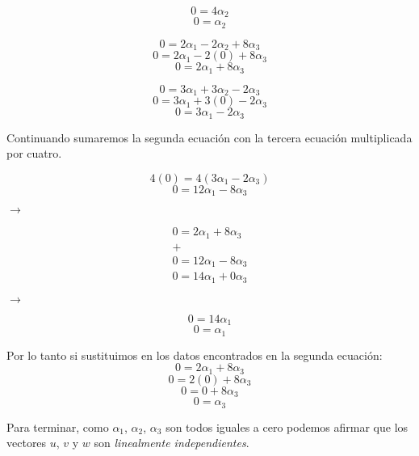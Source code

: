 \documentclass{article}
\begin{document}
\begin{minipage}[c]{0.5cm}
   $$0 = 4\alpha_2$$
   $$0 = \alpha_2$$
\end{minipage} \hspace*{3cm}
\begin{minipage}[c]{0.5cm}
   $$0 =  2\alpha_1 - 2\alpha_2+ 8\alpha_3$$
   $$0 = 2\alpha_1 -2(0) + 8\alpha_3$$
   $$0 = 2\alpha_1+ 8\alpha_3$$
\end{minipage} \hspace*{3cm}
\begin{minipage}[c]{0.5cm}
   $$0 = 3\alpha_1 + 3\alpha_2 -2\alpha_3$$
   $$0= 3\alpha_1 + 3(0) -2\alpha_3$$
   $$0= 3\alpha_1 -2\alpha_3$$
\end{minipage}
\vspace{10pt}


Continuando sumaremos la segunda ecuación con la tercera ecuación multiplicada por cuatro.


\begin{minipage}[c]{0.5cm}
   $$4(0) = 4 ( 3\alpha_1 -2\alpha_3)$$
   $$0 = 12\alpha_1 -8\alpha_3$$
\end{minipage}\hspace*{3cm}
$\rightarrow$
\hspace*{1.5cm}
\begin{minipage}[c]{0.5cm}
   $$
       \begin{array}{c}
           0 =   2\alpha_1+ 8\alpha_3 \\
           + \\
           0 = 12\alpha_1 -8\alpha_3 \\
           \hline
           0 = 14\alpha_1 +0\alpha_3
       \end{array}
   $$
\end{minipage}\hspace*{3cm}
$\rightarrow$
\hspace*{1.5cm}
\begin{minipage}[c]{0.5cm}
   $$0 = 14\alpha_1$$
   $$0 = \alpha_1$$
\end{minipage}
\vspace{10pt}


Por lo tanto si sustituimos en los datos encontrados en la segunda ecuación:
$$0 = 2\alpha_1+ 8\alpha_3$$
$$0 = 2(0) +8\alpha_3$$
$$0 = 0 + 8\alpha_3$$
$$0 = \alpha_3$$


Para terminar, como $\alpha_1$, $\alpha_2$, $\alpha_3$ son todos iguales a cero podemos afirmar que los vectores $u$,
$v$ y $w$ son \emph{linealmente independientes}.
\newpage
\end{document}

